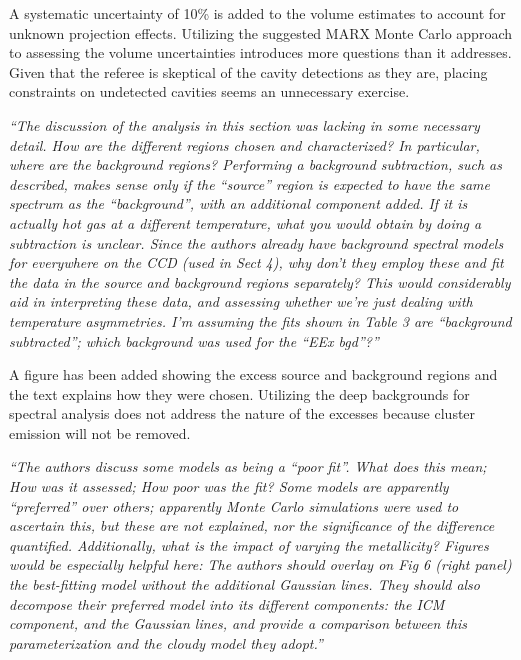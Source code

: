 \documentclass[11pt]{article}
\begin{document}
A systematic uncertainty of 10\% is added to the volume estimates to
account for unknown projection effects. Utilizing the suggested MARX
Monte Carlo approach to assessing the volume uncertainties introduces
more questions than it addresses. Given that the referee is skeptical
of the cavity detections as they are, placing constraints on
undetected cavities seems an unnecessary exercise.

\hrulefill

{\it{``The discussion of the analysis in this section was lacking in
    some necessary detail. How are the different regions chosen and
    characterized?  In particular, where are the background regions?
    Performing a background subtraction, such as described, makes
    sense only if the ``source'' region is expected to have the same
    spectrum as the ``background'', with an additional component
    added. If it is actually hot gas at a different temperature, what
    you would obtain by doing a subtraction is unclear. Since the
    authors already have background spectral models for everywhere on
    the CCD (used in Sect 4), why don't they employ these and fit the
    data in the source and background regions separately? This would
    considerably aid in interpreting these data, and assessing whether
    we're just dealing with temperature asymmetries. I'm assuming the
    fits shown in Table 3 are ``background subtracted''; which
    background was used for the ``EEx bgd''?''}}

A figure has been added showing the excess source and background
regions and the text explains how they were chosen. Utilizing the deep
backgrounds for spectral analysis does not address the nature of the
excesses because cluster emission will not be removed.

\hrulefill

{\it{``The authors discuss some models as being a ``poor fit''. What
    does this mean; How was it assessed; How poor was the fit? Some
    models are apparently ``preferred'' over others; apparently Monte
    Carlo simulations were used to ascertain this, but these are not
    explained, nor the significance of the difference
    quantified. Additionally, what is the impact of varying the
    metallicity? Figures would be especially helpful here: The authors
    should overlay on Fig 6 (right panel) the best-fitting model
    without the additional Gaussian lines. They should also decompose
    their preferred model into its different components: the ICM
    component, and the Gaussian lines, and provide a comparison
    between this parameterization and the cloudy model they adopt.''}}
\end{document}

